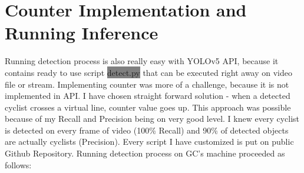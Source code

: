 \section{Counter Implementation and Running Inference}
\label{sec:inference}
Running detection process is also really easy with YOLOv5 API, because it contains ready to use script \colorbox{Gray}{detect.py} that can be executed right away on video file or stream. Implementing counter was more of a challenge, because it is not implemented in API. I have chosen straight forward solution - when a detected cyclist crosses a virtual line, counter value goes up. This approach was possible because of my Recall and Precision being on very good level. I knew every cyclist is detected on every frame of video (100\% Recall) and 90\% of detected objects are actually cyclists (Precision). Every script I have customized is put on public Github Repository\cite{repo}. Running detection process on GC's machine proceeded as follows:
